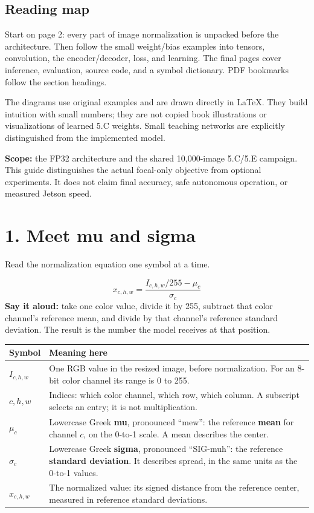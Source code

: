 \documentclass[11pt,letterpaper]{article}
\newcommand{\guidepage}[2]{\clearpage\pdfbookmark[0]{#1}{guide-\thepage}\section*{#1}{\sffamily\color{muted}#2}\par\vspace{5pt}}
\begin{document}
\subsection*{Reading map}
Start on page 2: every part of image normalization is unpacked before the architecture. Then follow the small weight/bias examples into tensors, convolution, the encoder/decoder, loss, and learning. The final pages cover inference, evaluation, source code, and a symbol dictionary. PDF bookmarks follow the section headings.

The diagrams use original examples and are drawn directly in LaTeX. They build intuition with small numbers; they are not copied book illustrations or visualizations of learned 5.C weights. Small teaching networks are explicitly distinguished from the implemented model.

{\small\textbf{Scope:} the FP32 architecture and the shared 10,000-image 5.C/5.E campaign. This guide distinguishes the actual focal-only objective from optional experiments. It does not claim final accuracy, safe autonomous operation, or measured Jetson speed.}

\guidepage{1. Meet mu and sigma}{Read the normalization equation one symbol at a time.}
\label{normalization}
\[
\boxed{x_{c,h,w}=\frac{I_{c,h,w}/255-\mu_c}{\sigma_c}}
\]
\textbf{Say it aloud:} take one color value, divide it by 255, subtract that color channel's reference mean, and divide by that channel's reference standard deviation. The result is the number the model receives at that position.

\begin{tabularx}{\linewidth}{@{}lY@{}}\toprule
\textbf{Symbol} & \textbf{Meaning here}\\\midrule
$I_{c,h,w}$ & One RGB value in the resized image, before normalization. For an 8-bit color channel its range is 0 to 255.\\
$c,h,w$ & Indices: which color channel, which row, which column. A subscript selects an entry; it is not multiplication.\\
$\mu_c$ & Lowercase Greek \textbf{mu}, pronounced ``mew'': the reference \textbf{mean} for channel $c$, on the 0-to-1 scale. A mean describes the center.\\
$\sigma_c$ & Lowercase Greek \textbf{sigma}, pronounced ``SIG-muh'': the reference \textbf{standard deviation}. It describes spread, in the same units as the 0-to-1 values.\\
$x_{c,h,w}$ & The normalized value: its signed distance from the reference center, measured in reference standard deviations.\\\bottomrule
\end{tabularx}
\end{document}
